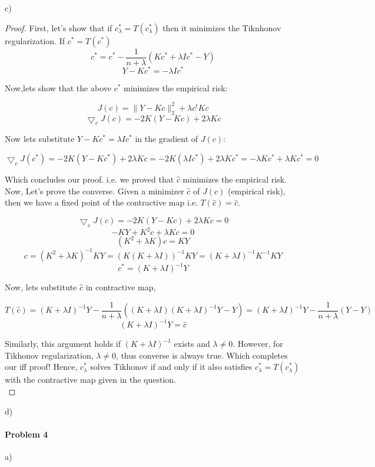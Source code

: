 \documentclass[12pt]{report}
\begin{document}
c) \begin{proof}
First, let's show that if $c_{\lambda}^* = T(c_{\lambda}^*)$  then it minimizes the Tiknhonov regularization.
If $ c^* = T(c^*) $ 
$$ c^* = c^* - \frac{1}{n+\lambda}(Kc^*+\lambda Ic^*-Y) $$
$$ Y - Kc^* = - \lambda Ic^* $$

Now,lets show that the above $c^*$ minimizes the empirical risk:

$$ J(c) = \|Y-Kc\|_2^2 + \lambda c^t K c $$
$$ \bigtriangledown_c J(c) = -2K(Y-Kc) + 2\lambda K c $$

Now lets substitute $Y-Kc^* = \lambda I c^*$ in the gradient of $J(c)$:

$$\bigtriangledown_c J(c^*) = -2K(Y-Kc^*) + 2\lambda K c  = -2K(\lambda I c^*) + 2\lambda K c^* = - \lambda K c^* + \lambda K c^* = 0 $$

Which concludes our proof. i.e. we proved that $\hat{c}$ minimizes the empirical risk. \\

Now, Let's prove the converse. Given a minimizer $\hat{c}$ of $J(c)$ (empirical risk), then we have a fixed point of the contractive map i.e. $T(\hat{c}) = \hat{c}$.

$$ \bigtriangledown_c J(c) = -2K(Y-Kc) + 2\lambda K c = 0 $$
$$ -KY + K^2c + \lambda K c = 0$$
$$ (K^2 + \lambda K)c = KY $$
$$ c = (K^2 + \lambda K)^{-1}KY = (K(K + \lambda I))^{-1}KY = (K + \lambda I)^{-1}K^{-1}KY $$
$$ c^* = (K + \lambda I)^{-1} Y $$

Now, lets substitute $\hat{c}$ in contractive map,

$$ T(\hat{c}) = (K + \lambda I)^{-1} Y - \frac{1}{n+\lambda}((K + \lambda I)(K + \lambda I)^{-1} Y-Y) = (K + \lambda I)^{-1} Y - \frac{1}{n+\lambda}(Y-Y) $$
$$ (K + \lambda I)^{-1} Y = \hat{c}$$

Similarly, this argument holds if $(K + \lambda I)^{-1}$ exists and $\lambda \neq 0$. However, for Tikhonov regularization, $\lambda \neq 0$, thus converse is always true. Which completes our iff proof! Hence, $c_{\lambda}^*$ solves Tikhonov if and only if it also satisfies $c_{\lambda}^* = T(c_{\lambda}^*)$ with the contractive map given in the question. \\
\end{proof}
d)


\paragraph{Problem 4}
a)
\end{document}
